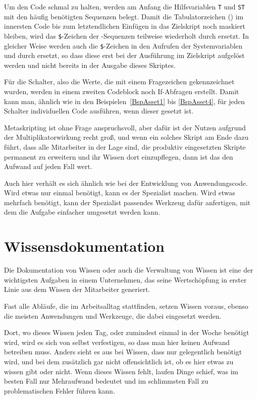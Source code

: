 Um den Code schmal zu halten, werden am Anfang die Hilfsvariablen \verb|T| und \verb|ST| mit den häufig benötigten Sequenzen belegt. Damit die Tabulatorzeichen () im innersten Code bis zum letztendlichen Einfügen in das Zielskript noch maskiert bleiben, wird das \verb|$|-Zeichen der -Sequenzen teilweise wiederholt durch  ersetzt. In gleicher Weise werden auch die \verb|$|-Zeichen in den Aufrufen der Systemvariablen  und  durch  ersetzt, so dass diese erst bei der Ausführung im Zielskript aufgelöst werden und nicht bereits in der Ausgabe dieses Skriptes.

Für die Schalter, also die Werte, die mit einem Fragezeichen gekennzeichnet wurden, werden in einem zweiten Codeblock noch If-Abfragen erstellt. Damit kann man, ähnlich wie in den Beispielen~\ref{BspAsset1} bis \ref{BspAsset4}, für jeden Schalter individuellen Code ausführen, wenn dieser gesetzt ist.

Metaskripting ist ohne Frage anspruchsvoll, aber dafür ist der Nutzen aufgrund der Multiplikatorwirkung recht groß, und wenn ein solches Skript am Ende dazu führt, dass alle Mitarbeiter in der Lage sind, die produktiv eingesetzten Skripte permanent zu erweitern und ihr Wissen dort einzupflegen, dann ist das den Aufwand auf jeden Fall wert.

Auch hier verhält es sich ähnlich wie bei der Entwicklung von Anwendungscode. Wird etwas nur einmal benötigt, kann es der Spezialist machen. Wird etwas mehrfach benötigt, kann der Spezialist passendes Werkzeug dafür anfertigen, mit dem die Aufgabe einfacher umgesetzt werden kann.

\section{Wissensdokumentation}\label{Wissensdokumentation}
Die Dokumentation von Wissen oder auch die Verwaltung von Wissen ist eine der wichtigsten Aufgaben in einem Unternehmen, das seine Wertschöpfung in erster Linie aus dem Wissen der Mitarbeiter generiert.

Fast alle Abläufe, die im Arbeitsalltag stattfinden, setzen Wissen voraus, ebenso die meisten Anwendungen und Werkzeuge, die dabei eingesetzt werden.

Dort, wo dieses Wissen jeden Tag, oder zumindest einmal in der Woche benötigt wird, wird es sich von selbst verfestigen, so dass man hier keinen Aufwand betreiben muss. Anders sieht es aus bei Wissen, dass nur gelegentlich benötigt wird, und bei dem zusätzlich gar nicht offensichtlich ist, ob es hier etwas zu wissen gibt oder nicht. Wenn dieses Wissen fehlt, laufen Dinge schief, was im besten Fall nur Mehraufwand bedeutet und im schlimmsten Fall zu problematischen Fehler führen kann.

